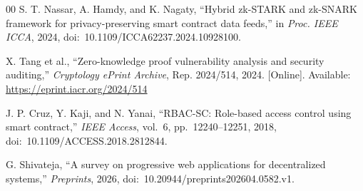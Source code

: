 \documentclass[conference]{IEEEtran}
\begin{document}
\begin{thebibliography}{00}
S. T. Nassar, A. Hamdy, and K. Nagaty, ``Hybrid zk-STARK and zk-SNARK framework for privacy-preserving smart contract data feeds,'' in \textit{Proc. IEEE ICCA}, 2024, doi:~10.1109/ICCA62237.2024.10928100.

X. Tang et al., ``Zero-knowledge proof vulnerability analysis and security auditing,'' \textit{Cryptology ePrint Archive}, Rep. 2024/514, 2024. [Online]. Available: \url{https://eprint.iacr.org/2024/514}

J. P. Cruz, Y. Kaji, and N. Yanai, ``RBAC-SC: Role-based access control using smart contract,'' \textit{IEEE Access}, vol.~6, pp.~12240--12251, 2018, doi:~10.1109/ACCESS.2018.2812844.

G. Shivateja, ``A survey on progressive web applications for decentralized systems,'' \textit{Preprints}, 2026, doi:~10.20944/preprints202604.0582.v1.

\end{thebibliography}
\end{document}
